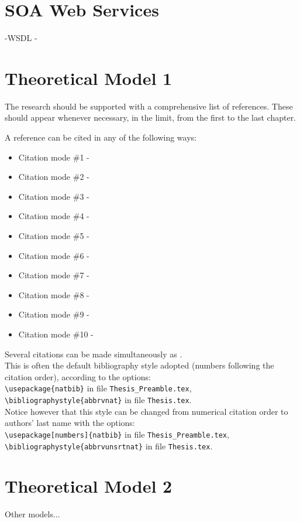 \section{SOA Web Services}
\label{section:soa}
-WSDL
-

\section{Theoretical Model 1}
\label{section:theory1}

The research should be supported with a comprehensive list of references.
These should appear whenever necessary, in the limit, from the first to the last chapter.

A reference can be cited in any of the following ways:
%
\begin{itemize}
  \item Citation mode \#1 - \quad \cite{jameson:adjointns}
  \item Citation mode \#2 - \quad \citet{jameson:adjointns}
  \item Citation mode \#3 - \quad \citep{jameson:adjointns}
  \item Citation mode \#4 - \quad \citet*{jameson:adjointns}
  \item Citation mode \#5 - \quad \citep*{jameson:adjointns}
  \item Citation mode \#6 - \quad \citealt{jameson:adjointns}
  \item Citation mode \#7 - \quad \citealp{jameson:adjointns}
  \item Citation mode \#8 - \quad \citeauthor{jameson:adjointns}
  \item Citation mode \#9 - \quad \citeyear{jameson:adjointns}
  \item Citation mode \#10 - \quad \citeyearpar{jameson:adjointns}
\end{itemize}
%
Several citations can be made simultaneously as \citep{nocedal:opt,marta:ijcfd}. \\

This is often the default bibliography style adopted (numbers following the citation order), according to the options:\\
{\tt \textbackslash usepackage\{natbib\}} in file {\tt Thesis\_Preamble.tex},\\
{\tt \textbackslash bibliographystyle\{abbrvnat\}} in file {\tt Thesis.tex}.\\
%
Notice however that this style can be changed from numerical citation order to authors' last name with the options: \\
{\tt \textbackslash usepackage[numbers]\{natbib\}} in file {\tt Thesis\_Preamble.tex},\\
{\tt \textbackslash bibliographystyle\{abbrvunsrtnat\}} in file {\tt Thesis.tex}.


\section{Theoretical Model 2}
\label{section:theory2}

Other models...
